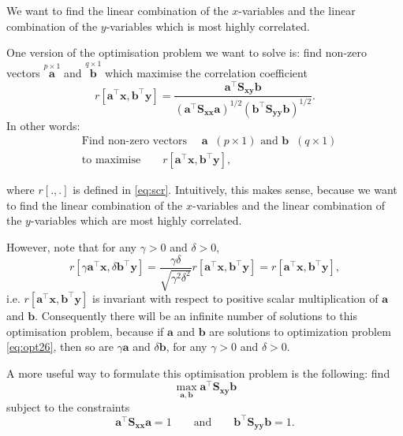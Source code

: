 \documentclass[]{book}
\theoremstyle{definition}
\theoremstyle{definition}
\theoremstyle{definition}
\theoremstyle{remark}
\begin{document}
We want to find the linear combination of the \(x\)-variables and the linear combination of the \(y\)-variables which is most highly correlated.

One version of the optimisation problem we want to solve is: find non-zero vectors \(\stackrel{p \times 1}{\boldsymbol a}\) and \(\stackrel{q \times 1}{\boldsymbol b}\) which maximise the correlation coefficient
\[
r[\boldsymbol a^\top \boldsymbol x,\boldsymbol b^\top \boldsymbol y]=\frac{\boldsymbol a^\top \boldsymbol S_{\boldsymbol x\boldsymbol y}\boldsymbol b}{(\boldsymbol a^\top \boldsymbol S_{\boldsymbol x\boldsymbol x}\boldsymbol a)^{1/2}(\boldsymbol b^\top \boldsymbol S_{\boldsymbol y\boldsymbol y}\boldsymbol b)^{1/2}}.
\]
In other words:
\begin{align}
  &\mbox{Find non-zero vectors }\quad  \boldsymbol a\;\; (p \times 1)\mbox{ and  } \boldsymbol b\;\; (q \times 1) \nonumber\\
  &\mbox{to maximise} \qquad  r[\boldsymbol a^\top \boldsymbol x,\boldsymbol b^\top \boldsymbol y],
\label{eq:opt26}
\end{align}

where \(r[.,.]\) is defined in \eqref{eq:scr}.
Intuitively, this makes sense, because we want to find the linear combination of the \(x\)-variables and the linear combination of the \(y\)-variables which are most highly correlated.

However, note that for any \(\gamma>0\) and \(\delta>0\),
\begin{equation}
  r[\gamma\boldsymbol a^\top \boldsymbol x, \delta \boldsymbol b^\top \boldsymbol y]= \frac{\gamma \delta}{\sqrt{\gamma^2 \delta^2}}r[\boldsymbol a^\top \boldsymbol x,\boldsymbol b^\top \boldsymbol y]=r[\boldsymbol a^\top \boldsymbol x,\boldsymbol b^\top \boldsymbol y],
  \label{eq:invar}
  \end{equation}
i.e. \(r[\boldsymbol a^\top \boldsymbol x,\boldsymbol b^\top \boldsymbol y]\) is invariant with respect to positive scalar multiplication of \(\boldsymbol a\) and \(\boldsymbol b\). Consequently there will be an infinite number of solutions to this optimisation problem, because if \(\boldsymbol a\) and \(\boldsymbol b\) are solutions to optimization problem \eqref{eq:opt26}, then so are \(\gamma \boldsymbol a\) and \(\delta \boldsymbol b\), for any \(\gamma>0\) and \(\delta>0\).

A more useful way to formulate this optimisation problem is the following: find
\begin{equation}
\max_{\boldsymbol a, \boldsymbol b} \boldsymbol a^\top \boldsymbol S_{\boldsymbol x\boldsymbol y}\boldsymbol b
\label{eq:opt27a}
\end{equation}
subject to the constraints
\begin{equation}
\boldsymbol a^\top \boldsymbol S_{\boldsymbol x\boldsymbol x}\boldsymbol a=1 \qquad \text{and} \qquad \boldsymbol b^\top \boldsymbol S_{\boldsymbol y\boldsymbol y}\boldsymbol b=1.
\label{eq:opt27b}
\end{equation}
\end{document}
